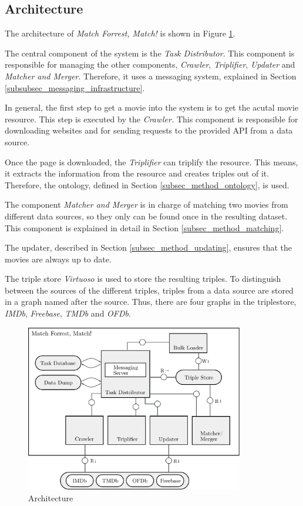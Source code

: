 \subsection{Architecture}
\label{subsec_method_architecture}

The architecture of \emph{Match Forrest, Match!} is shown in Figure \ref{fig_architecture}.

The central component of the system is the \textit{Task Distributor}.
This component is responsible for managing the other components, \textit{Crawler}, \textit{Triplifier}, \textit{Updater} and \textit{Matcher and Merger}.
Therefore, it uses a messaging system, explained in Section \ref{subsubsec_messaging_infrastructure}.

In general, the first step to get a movie into the system is to get the acutal movie resource.
This step is executed by the \textit{Crawler.}
This component is responsible for downloading websites and for sending requests to the provided API from a data source.

Once the page is downloaded, the \textit{Triplifier} can triplify the resource.
This means, it extracts the information from the resource and creates triples out of it.
Therefore, the ontology, defined in Section \ref{subsec_method_ontology}, is used.

The component \textit{Matcher and Merger} is in charge of matching two movies from different data sources, so they only can be found once in the resulting dataset.
This component is explained in detail in Section \ref{subsec_method_matching}.

The updater, described in Section \ref{subsec_method_updating}, ensures that the movies are always up to date.

The triple store \textit{Virtuoso} is used to store the resulting triples.
To distinguish between the sources of the different triples, triples from a data source are stored in a graph named after the source.
Thus, there are four graphs in the triplestore, \textit{IMDb}, \textit{Freebase}, \textit{TMDb} and \textit{OFDb}.

\begin{figure}[ht]
  \begin{center}
  \includegraphics[width=0.85\textwidth]{images/architecture.pdf}
  \end{center}
  \caption{Architecture}
  \label{fig_architecture}
\end{figure}

